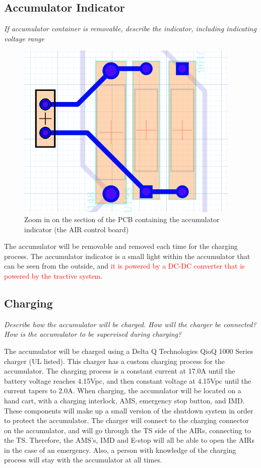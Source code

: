 \documentclass{article}
\begin{document}

\subsection{Accumulator Indicator}

    \textit{If accumulator container is removable, describe the indicator, including indicating voltage range}

        \begin{figure}[H]
            \centering
            \includegraphics[width = 0.3 \textwidth]{accuindicator}
            \caption{Zoom in on the section of the PCB containing the accumulator indicator (the AIR control board)}
            \label{aindicatorPCB}
        \end{figure}

    The accumulator will be removable and removed each time for the charging process. The accumulator indicator is a small light within the accumulator that can be seen from the outside, and \textcolor{red}{it is powered by a DC-DC converter that is powered by the tractive system}.

\subsection{Charging}

\textit{Describe how the accumulator will be charged. How will the charger be connected? How is the accumulator to be supervised during charging?}

The accumulator will be charged using a Delta Q Technologies QioQ 1000 Series charger (UL listed). This charger has a custom charging process for the accumulator. The charging process is a constant current at 17.0A until the battery voltage reaches 4.15Vpc, and then constant voltage at 4.15Vpc until the current tapers to 2.0A. When charging, the accumulator will be located on a hand cart, with a charging interlock, AMS, emergency stop button, and IMD. These components will make up a small version of the shutdown system in order to protect the accumulator. The charger will connect to the charging connector on the accumulator, and will go through the TS side of the AIRs, connecting to the TS. Therefore, the AMS's, IMD and E-stop will all be able to open the AIRs in the case of an emergency. Also, a person with knowledge of the charging process will stay with the accumulator at all times.
\end{document}
